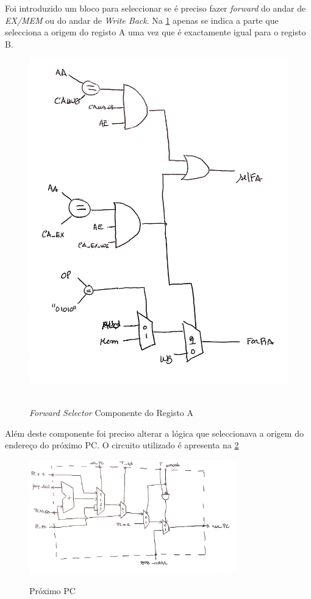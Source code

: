 Foi introduzido um bloco para seleccionar se é preciso fazer \textit{forward} do andar de \textit{EX/MEM} ou do andar de \textit{Write Back}. Na \ref{fig:forward} apenas se indica a parte que selecciona a origem do registo A uma vez que é exactamente igual para o registo B.

\begin{figure}[H]
    \centering
    \includegraphics[keepaspectratio=true, scale=0.1]{./forward_selector.jpg}~\\[1cm]
    \caption{\textit{Forward Selector} Componente do Registo A}
    \label{fig:forward}
\end{figure}

Além deste componente foi preciso alterar a lógica que seleccionava a origem do endereço do próximo PC. O circuito utilizado é apresenta na \ref{fig:nextpc}

\begin{figure}[H]
    \centering
    \includegraphics[width=0.8\textwidth]{./nextpc.jpg}~\\[1cm]
    \caption{Próximo PC}
    \label{fig:nextpc}
\end{figure}

